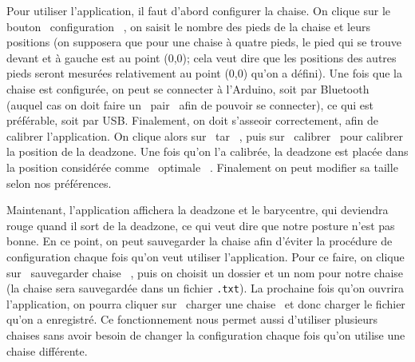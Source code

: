 \documentclass{polytech/polytech}
\begin{document}
Pour utiliser l'application, il faut d'abord configurer la chaise. On clique sur le bouton \guillemotleft\ configuration \guillemotright\ , on saisit le nombre des pieds de la chaise et leurs positions (on supposera que pour une chaise à quatre pieds, le pied qui se trouve devant et à gauche est au point (0,0); cela veut dire que les positions des autres pieds seront mesurées relativement au point (0,0) qu'on a défini). Une fois que la chaise est configurée, on peut se connecter à l'Arduino, soit par Bluetooth (auquel cas on doit faire un \guillemotleft\ pair \guillemotright\  afin de pouvoir se connecter), ce qui est préférable, soit par USB. Finalement, on doit s'asseoir correctement, afin de calibrer l'application. On clique alors sur \guillemotleft\ tar \guillemotright\ , puis sur \guillemotleft\ calibrer \guillemotright\  pour calibrer la position de la deadzone. Une fois qu'on l'a calibrée, la deadzone est placée dans la position considérée comme \guillemotleft\ optimale \guillemotright\ . Finalement on peut modifier sa taille selon nos préférences. 

Maintenant, l'application affichera la deadzone et le barycentre, qui deviendra rouge quand il sort de la deadzone, ce qui veut dire que notre posture n'est pas bonne. En ce point, on peut sauvegarder la chaise afin d'éviter la procédure de configuration chaque fois qu'on veut utiliser l'application. Pour ce faire, on clique sur \guillemotleft\ sauvegarder chaise \guillemotright\ , puis on choisit un dossier et un nom pour notre chaise (la chaise sera sauvegardée dans un fichier \texttt{.txt}). La prochaine fois qu'on ouvrira l'application, on pourra cliquer sur \guillemotleft\ charger une chaise \guillemotright\  et donc charger le fichier qu'on a enregistré. Ce fonctionnement nous permet aussi d'utiliser plusieurs chaises sans avoir besoin de changer la configuration chaque fois qu'on utilise une chaise différente.


\end{document}
